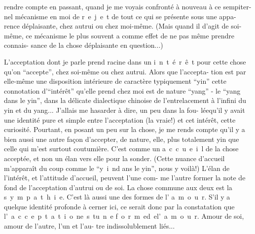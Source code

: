 rendre compte en passant, quand je me voyais confronté à nouveau à ce sempiter-\linebreak
nel mécanisme en moi de \mbox{r e j e t} de tout ce qui se présente sous une appa-\linebreak
rence déplaisante, chez autrui ou chez moi-même. (Mais quand il d'agit de soi-\linebreak
même, ce mécanisme le plus souvent a comme effet de ne pas même prendre connais-\linebreak
sance de la chose déplaisante en question...)

L'acceptation dont je parle prend racine dans un \mbox{i n t é r ê t} pour
cette chose qu'on ``accepte'', chez soi-même ou chez autrui. Alors que l'accepta-\linebreak
tion est par elle-même une disposition intérieure de caractère typiquement ``yin''\unsure{;}
cette connotation d'``intérêt'' qu'elle prend chez moi est de nature ``yang'' - 
le ``yang dans le yin'', dans la délicate dialectique chinoise de l'entrelacement
à l'infini du yin et du yang... J'allais me hasarder à dire, un peu dans la fou-\linebreak
lée\inserted{,}qu'il y avait une identité pure et simple entre l'acceptation (la vraie!)
et cet intérêt, cette curiosité. Pourtant, en posant un peu sur la chose, je me
rends compte qu'il y a bien aussi une autre façon d'accepter, de nature, elle,
plus totalement yin que celle qui m'est surtout coutumière. C'est comme un
\mbox{a c c u e i l} de la chose acceptée, et non un élan vers elle pour la sonder.
(Cette nuance d'accueil m'apparaît du coup comme le ``\mbox{y i n}\quad d ans le yin'',
nous y voilà!) L'élan de l'intérêt, et l'attitude d'accueil, peuvent l'une com-\linebreak
me l'autre former la note de fond de l'acceptation d'autrui ou de soi. La chose
commune aux deux est la \mbox{s y m p a t h i e}. C'est là aussi une des formes de
l' \mbox{a m o u r}. S'il y a quelque identité profonde à cerner ici, ce serait
donc par la constatation que \mbox{l' a c c e p t a t i o n\quad e s t\quad u n e}
\mbox{f o r m e\quad d e\quad l' a m o u r}. Amour de soi, amour de l'autre, l'un et l'au-\linebreak
tre indissolublement liés...

